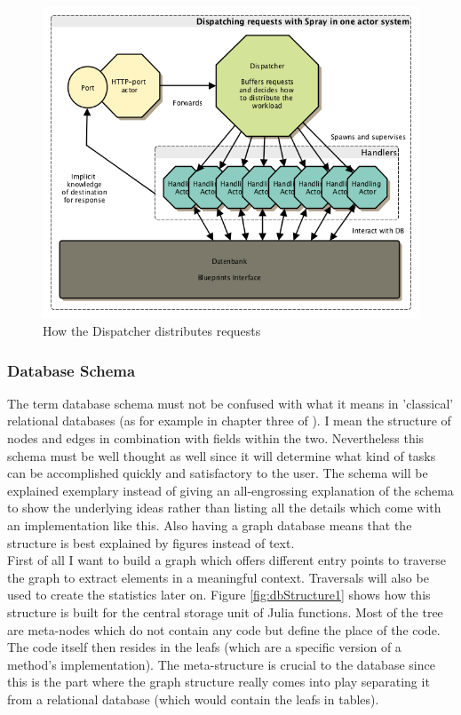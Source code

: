 \documentclass[11p]{scrartcl}
\begin{document}
\begin{figure}[h!]		
 	\includegraphics[scale=0.6]{figures/sprayDispatcher.png}
	\caption{How the Dispatcher distributes requests}
	\label{fig:sprayDispatcher}
\end{figure}

\subsubsection{Database Schema}
The term database schema must not be confused with what it means in 'classical' relational databases (as for example in chapter three of \cite{fundamentalsDatabase}). I mean the structure of nodes and edges in combination with fields within the two. Nevertheless this schema must be well thought as well since it will determine what kind of tasks can be accomplished quickly and satisfactory to the user. The schema will be explained exemplary instead of giving an all-engrossing explanation of the schema to show the underlying ideas rather than listing all the details which come with an implementation like this. Also having a graph database means that the structure is best explained by figures instead of text.\\

First of all I want to build a graph which offers different entry points to traverse the graph to extract elements in a meaningful context. Traversals will also be used to create the statistics later on. Figure \ref{fig:dbStructure1} shows how this structure is built for the central storage unit of Julia functions. Most of the tree are meta-nodes which do not contain any code but define the place of the code. The code itself then resides in the leafs (which are a specific version of a method's implementation).  The meta-structure is crucial to the database since this is the part where the graph structure really comes into play separating it from a relational database (which would contain the leafs in tables).
\end{document}
